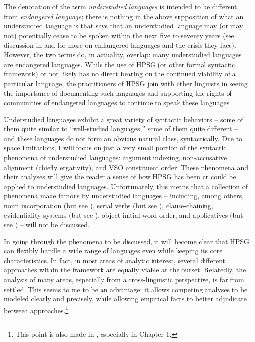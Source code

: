 \documentclass[output=paper
                ,modfonts
                ,nonflat
	        ,collection
	        ,collectionchapter
	        ,collectiontoclongg
 	        ,biblatex
                ,babelshorthands
                ,newtxmath
                ,draftmode
                ,colorlinks, citecolor=brown
]{./langsci/langscibook}
\begin{document}
{The denotation of the term \textit{understudied languages} is intended to be different from \textit{endangered language}; there is nothing in the above supposition of what an understudied language is that says that an understudied language may (or may not) potentially cease to be spoken within the next five to seventy years (see discussion in \citealt{krauss92} and \citealt{SL13} for more on endangered languages and the crisis they face).  However, the two terms do, in actuality, overlap: many understudied languages are endangered languages. While the use of HPSG (or other formal syntactic framework) or not likely has no direct bearing on the continued viability of a particular language, the practitioners of HPSG join with other linguists in seeing the importance of documenting such languages and supporting the rights of communities of endangered languages to continue to speak these languages.       

Understudied languages exhibit a great variety of syntactic behaviors -- some of them quite similar to ``well-studied languages,'' some of them quite different -- and these languages do not form an obvious natural class, syntactically. Due to space limitations, I will focus on just a very small portion of the syntactic phenomena of understudied languages: argument indexing, non-accusative alignment (chiefly ergativity), and VSO constituent order. These phenomena and their analyses will give the reader a sense of how HPSG has been or could be applied to understudied languages. Unfortunately, this means that a collection of phenomena made famous by understudied languages -- including, among others, noun incorporation (but see \citealt{malouf99,runara03,ball05afla,ball05hpsg,ball08thesis}), serial verbs (but see \citealt{muansuwan01,muansuwan02,KDHB2007a,ML2009a,lee14}), clause-chaining, evidentiality systems (but see \citealt{lee12}), object-initial word order, and applicatives (but see \citealt{runara03,ball08thesis,ball10}) -- will not be discussed. 

In going through the phenomena to be discussed, it will become clear that HPSG can flexibly handle a wide range of languages even while keeping its core characteristics. In fact, in most areas of analytic interest, several different approaches within the framework are equally viable at the outset. Relatedly, the analysis of many areas, especially from a cross-linguistic perspective, is far from settled. This seems to me to be an advantage: it allows competing analyses to be modeled clearly and precisely, while allowing empirical facts to better adjudicate between approaches.\footnote{This point is also made in \citet{fokkens14}, especially in Chapter 1.}

}
\end{document}
